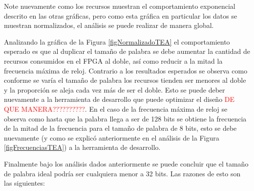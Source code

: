 	
Note nuevamente como los recursos muestran el comportamiento exponencial descrito en las otras gráficas, pero como esta gráfica en particular los datos se muestran normalizados, el análisis se puede realizar de manera global.

Analizando la gráfica de la Figura \ref{figNormalizadoTEA} el comportamiento esperado es que al duplicar el tamaño de palabra se debe aumentar la cantidad de recursos consumidos en el FPGA al doble, así como reducir a la mitad la frecuencia máxima de reloj. Contrario a los resultados esperados se observa como conforme se varía el tamaño de palabra los recursos tienden ser menores al doble y la proporción se aleja cada vez más de ser el doble. Esto se puede deber nuevamente a la herramienta de desarrollo que puede optimizar el diseño \textcolor{red}{DE QUE MANERA??????????}. En el caso de la frecuencia máxima de reloj se observa como hasta que la palabra llega a ser de 128 bits se obtiene la frecuencia de la mitad de la frecuencia para el tamaño de palabra de 8 bits, esto se debe nuevamente (y como se explicó anteriormente en el análisis de la Figura \ref{figFrecuenciasTEA}) a la herramienta de desarrollo.


Finalmente bajo los análisis dados anteriormente se puede concluir que el tamaño de palabra ideal podría ser cualquiera menor a 32 bits. Las razones de esto son las siguientes:

